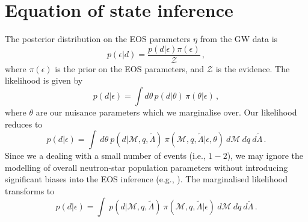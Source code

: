 \documentclass[twocolumn,linenumbers]{aastex631}
\begin{document}
\appendix


\section{Equation of state inference}
\label{sec:EOS_inference}

The posterior distribution on the EOS parameters $\eta$ from the GW data is
%
\begin{equation}
  p(\epsilon| d) = \frac{p(d|{\epsilon})\pi(\epsilon)}{\mathcal{Z}}\,,
\end{equation}
%
where $\pi(\epsilon)$ is the prior on the EOS parameters, and
$\mathcal{Z}$ is the evidence. The likelihood is given by
%
\begin{equation}
    p(d|\epsilon) = \int  d\theta \,p(d|\theta)\,\pi(\theta|\epsilon)\,,
\end{equation}
%
where $\theta$ are our nuisance parameters which we marginalise over.
Our likelihood reduces to
%
\begin{equation}
    p(d|\epsilon) = \int \ d\theta \ p(d|\mathcal{M},q,\tilde{\Lambda})
    \ \pi(\mathcal{M},q,\tilde{\Lambda}|\epsilon,\theta) \ d\mathcal{M}
    \ dq \ d \tilde{\Lambda}\,.
\end{equation}
%
Since we a dealing with a small number of events (i.e., $1-2$), we may
ignore the modelling of overall neutron-star population parameters
without introducing significant biases into the EOS inference (e.g.,
\citealt{2015Agathos, 2020Wysocki, 2020Landry}). The marginalised
likelihood transforms to
%
\begin{equation}
    p(d|\epsilon) = \int \ p(d|\mathcal{M},q,\tilde{\Lambda})
    \ \pi(\mathcal{M},q,\tilde{\Lambda}|\epsilon)\ d\mathcal{M} \ dq \ d
    \tilde{\Lambda}\,.
    \label{eq:P_d_eps}
\end{equation}
\end{document}
